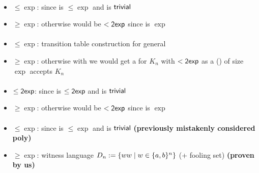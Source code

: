 \paragraph{\OMOLA{}\tto\TNFA}
\begin{itemize}
	\item $\le\exp$: since \hyperref[cost:OM1LAto1NFA]{\OMOLA{}\tto\ONFA} is $\le\exp$ and \ONFA{}\tto\TNFA is $\mathsf{trivial}$
	\item $\ge\exp$: otherwise \hyperref[cost:OM1LAto1DFA]{\OMOLA{}\tto\ODFA} would be $<\mathsf{2exp}$ since \hyperref[cost:2NFAto1DFA]{\TNFA{}\tto\ODFA} is $\exp$
\end{itemize}
\paragraph{\OMODLA{}\tto\ODFA}\label{cost:OM1DLAto1DFA}
\begin{itemize}
	\item $\le\exp$: transition table construction for general \OLA \cite{PigPis14}
	\item $\ge\exp$: otherwise with \hyperref[cost:OM1DLAto1DFA]{\OMODLA{}\tto\ODFA} we would get a \ODFA for $K_n$ with $<\mathsf{2exp}$ as a \OMODLA (\TDFA) of size $\exp$ accepts $K_n$
\end{itemize}
\paragraph{\OMOLA{}\tto\OMODLA}
\begin{itemize}
	\item $\le\mathsf{2exp}$: since \hyperref[cost:OM1LAto1DFA]{\OMOLA{}\tto\ODFA} is $\le\mathsf{2exp}$ and \ODFA{}\tto\OMODLA is $\mathsf{trivial}$
	\item $\ge\exp$: otherwise \hyperref[cost:OM1LAto1DFA]{\OMOLA{}\tto\ODFA} would be $<\mathsf{2exp}$ since \hyperref[cost:OM1DLAto1DFA]{\OMODLA{}\tto\ODFA} is $\exp$
\end{itemize}
\paragraph{\OMODLA{}\tto\ONFA}
\begin{itemize}
	\item $\le\exp$: since \hyperref[cost:OM1DLAto1DFA]{\OMODLA{}\tto\ODFA} is $\le\exp$ and \ODFA{}\tto\ONFA is $\mathsf{trivial}$ \textbf{(previously mistakenly considered poly)}
	\item $\ge\exp$: witness language $D_n:=\{ww\mid w\in\{a,b\}^n\}$ (\OMODLA + fooling set) \textbf{(proven by us)}
\end{itemize}
